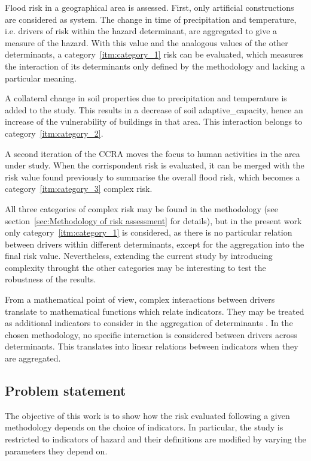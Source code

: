 \begin{example}
  Flood \gls{risk} in a geographical area is assessed. First, only artificial constructions are considered as system.
  The change in time of precipitation and temperature, i.e. \glspl{driver} of \gls{risk} within the \gls{hazard} \gls{determinant}, are aggregated to give a measure of the \gls{hazard}. With this value and the analogous values of the other \glspl{determinant}, a category~\ref{itm:category_1} \gls{risk} can be evaluated, which measures the interaction of its \glspl{determinant} only defined by the methodology and lacking a particular meaning.
  
  A collateral change in soil properties due to precipitation and temperature is added to the study. This results in a decrease of soil \gls{adaptive_capacity}, hence an increase of the \gls{vulnerability} of buildings in that area. This interaction belongs to category~\ref{itm:category_2}.
  
  A second iteration of the \gls{CCRA} moves the focus to human activities in the area under study. When the corrispondent \gls{risk} is evaluated, it can be merged with the \gls{risk} value found previously to summarise the overall flood \gls{risk}, which becomes a category~\ref{itm:category_3} complex \gls{risk}.
\end{example}

All three categories of complex \gls{risk} may be found in the methodology (see section~\ref{sec:Methodology of risk assessment} for details), but in the present work only category~\ref{itm:category_1} is considered, as there is no particular relation between \glspl{driver} within different \glspl{determinant}, except for the aggregation into the final \gls{risk} value.
Nevertheless, extending the current study by introducing complexity throught the other categories may be interesting to test the robustness of the results.

From a mathematical point of view, complex interactions between \glspl{driver} translate to mathematical functions which relate \glspl{indicator}. They may be treated as additional \glspl{indicator} to consider in the aggregation of \glspl{determinant} \cite[39-40]{2008OECDHandbookOn}.
In the chosen methodology, no specific interaction is considered between drivers across determinants. This translates into linear relations between indicators when they are aggregated.



\subsection{Problem statement}
The objective of this work is to show how the \gls{risk} evaluated following a given methodology depends on the choice of \glspl{indicator}. In particular, the study is restricted to indicators of \gls{hazard} and their definitions are modified by varying the parameters they depend on.

